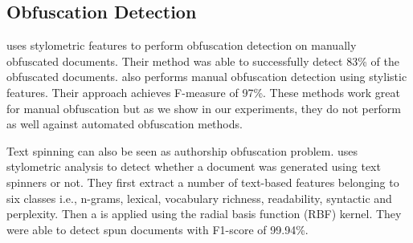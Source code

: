 \subsection{Obfuscation Detection}
\cite{juola2012detecting} uses stylometric features to perform obfuscation detection on manually obfuscated documents.
%
Their method was able to successfully detect 83\% of the obfuscated documents.
%
%
\cite{afroz2012detecting} also performs manual obfuscation detection using stylistic features.
%
Their approach achieves F-measure of 97\%.
%
%
These methods work great for manual obfuscation but as we show in our experiments, they do not perform as well against automated obfuscation methods.
%

Text spinning can also be seen as authorship obfuscation problem.
%
\cite{shahid2017accurate} uses stylometric analysis to detect whether a document was generated using text spinners or not.
%
They first extract a number of text-based features belonging to six classes i.e., n-grams, lexical, vocabulary richness, readability, syntactic and perplexity.
%
Then a \svm is applied using the radial basis function (RBF) kernel.
%
They were able to detect spun documents with F1-score of 99.94\%.

